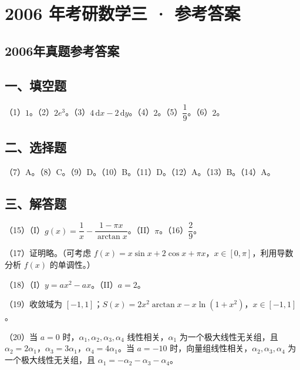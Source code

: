 \documentclass[UTF8,12pt]{ctexart}
\begin{document}
\section*{2006 年考研数学三 · 参考答案}
\subsection*{2006年真题参考答案}

\subsection*{一、填空题}

（1）\(\displaystyle 1\)。（2）\(\displaystyle 2e^3\)。（3）\(\displaystyle 4\,\mathrm dx-2\,\mathrm dy\)。（4）\(\displaystyle 2\)。（5）\(\displaystyle \dfrac{\displaystyle 1}{\displaystyle 9}\)。（6）\(\displaystyle 2\)。


\subsection*{二、选择题}

（7）A。（8）C。（9）D。（10）B。（11）D。（12）A。（13）B。（14）A。


\subsection*{三、解答题}

（15）（I）\(\displaystyle g(x)=\dfrac{\displaystyle 1}{\displaystyle x}-\dfrac{\displaystyle 1-\pi x}{\displaystyle \arctan x}\)。（II）\(\displaystyle \pi\)。（16）\(\displaystyle \dfrac{\displaystyle 2}{\displaystyle 9}\)。


（17）证明略。（可考虑 \(\displaystyle f(x)=x\sin x+2\cos x+\pi x\)，\(\displaystyle x\in[0,\allowbreak \pi]\)，利用导数分析 \(\displaystyle f(x)\) 的单调性。）


（18）（I）\(\displaystyle y=ax^2-ax\)。（II）\(\displaystyle a=2\)。


（19）收敛域为 \(\displaystyle [-1,\allowbreak 1]\)；\(\displaystyle S(x)=2x^2\arctan x-x\ln(1+x^2)\)，\(\displaystyle x\in[-1,\allowbreak 1]\)。


（20）当 \(\displaystyle a=0\) 时，\(\displaystyle \alpha_1,\allowbreak \alpha_2,\allowbreak \alpha_3,\allowbreak \alpha_4\) 线性相关，\(\displaystyle \alpha_1\) 为一个极大线性无关组，且 \(\displaystyle \alpha_2=2\alpha_1\)，\(\displaystyle \alpha_3=3\alpha_1\)，\(\displaystyle \alpha_4=4\alpha_1\)。当 \(\displaystyle a=-10\) 时，向量组线性相关，\(\displaystyle \alpha_2,\allowbreak \alpha_3,\allowbreak \alpha_4\) 为一个极大线性无关组，且 \(\displaystyle \alpha_1=-\alpha_2-\alpha_3-\alpha_4\)。
\end{document}
